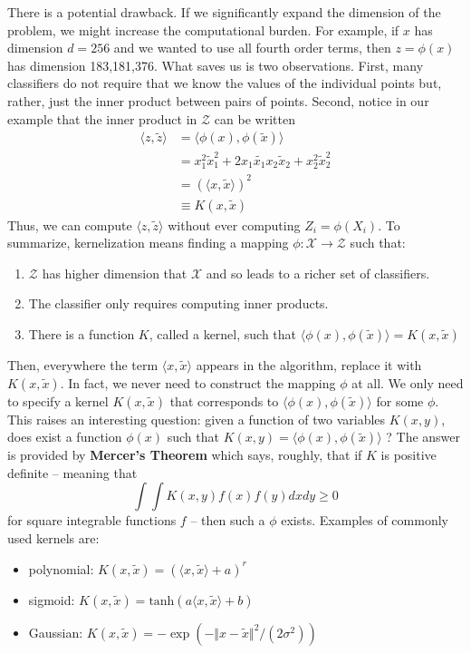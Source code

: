 There is a potential drawback. If we significantly expand the dimension
of the problem, we might increase the computational burden. For example,
if \(x\) has dimension \(d = 256\) and we wanted to use all fourth order
terms, then \(z = \phi(x)\) has dimension 183,181,376. What saves us is
two observations. First, many classifiers do not require that we know
the values of the individual points but, rather, just the inner product
between pairs of points. Second, notice in our example that the inner
product in \(\mathcal{Z}\) can be written
\begin{align*}
\langle z, \tilde{z} \rangle &= \langle \phi(x), \phi(\tilde{x}) \rangle \\
&= x_{1}^{2} \tilde{x}_{1}^{2} + 2 x_{1} \tilde{x_{1}} x_{2} \tilde{x}_{2} + x_{2}^{2} \tilde{x}_{2}^{2} \\
&= ( \langle x, \tilde{x} \rangle )^{2} \\
&\equiv K(x, \tilde{x})
\end{align*}
Thus, we can compute \(\langle z, \tilde{z} \rangle\) without ever
computing \(Z_{i} = \phi(X_{i})\).
To summarize, kernelization means finding a mapping
\(\phi: \mathcal{X} \rightarrow \mathcal{Z}\) such that:
\begin{enumerate}
\def\labelenumi{\arabic{enumi}.}
\item
  \(\mathcal{Z}\) has higher dimension that \(\mathcal{X}\) and so leads
  to a richer set of classifiers.
\item
  The classifier only requires computing inner products.
\item
  There is a function \(K\), called a kernel, such that
  \(\langle \phi(x), \phi(\tilde{x}) \rangle = K(x, \tilde{x})\)
\end{enumerate}
Then, everywhere the term \(\langle x, \tilde{x} \rangle\) appears in
the algorithm, replace it with \(K(x, \tilde{x})\).
In fact, we never need to construct the mapping \(\phi\) at all. We only
need to specify a kernel \(K(x, \tilde{x})\) that corresponds to
\(\langle \phi(x), \phi(\tilde{x}) \rangle\) for some \(\phi\). This
raises an interesting question: given a function of two variables
\(K(x, y)\), does exist a function \(\phi(x)\) such that
\(K(x, y) = \langle \phi(x), \phi(\tilde{x}) \rangle\) ? The answer is
provided by \textbf{Mercer's Theorem} which says, roughly, that if \(K\)
is positive definite -- meaning that
\[
\int \int K(x, y) f(x) f(y) dx dy \geq 0
\]
for square integrable functions \(f\) -- then such a \(\phi\) exists.
Examples of commonly used kernels are:
\begin{itemize}[tightlist]
\item
  polynomial: \(K(x, \tilde{x}) = (\langle x, \tilde{x} \rangle + a)^r\)
\item
  sigmoid:
  \(K(x, \tilde{x}) = \text{tanh} (a \langle x, \tilde{x} \rangle + b)\)
\item
  Gaussian:
  \(K(x, \tilde{x}) = -\exp \left( - \Vert x - \tilde{x} \Vert^{2} / (2 \sigma^{2}) \right)\)
\end{itemize}
